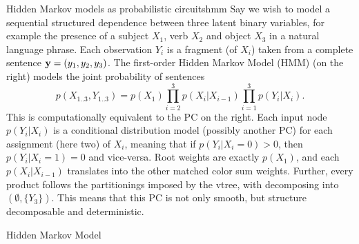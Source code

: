 \begin{example}[sidebyside,lefthand width=0.55\textwidth]{Hidden Markov models as probabilistic circuits}{hmm}
  Say we wish to model a sequential structured dependence between three latent binary variables, for
  example the presence of a subject $X_1$, verb $X_2$ and object $X_3$ in a natural language
  phrase. Each observation $Y_i$ is a fragment (of $X_i$) taken from a complete sentence
  $\mathbf{y}=(y_1,y_2,y_3)$. The first-order Hidden Markov Model (HMM) (on the right) models the
  joint probability of sentences
  \begin{equation*}
    p(X_{1..3},Y_{1..3})=p(X_1)\prod_{i=2}^3 p(X_i|X_{i-1})\prod_{i=1}^3 p(Y_i|X_i).
  \end{equation*}
  This is computationally equivalent to the PC on the right. Each input node $p(Y_i|X_i)$ is a
  conditional distribution model (possibly another PC) for each assignment (here two) of $X_i$,
  meaning that if $p(Y_i|X_i=0)>0$, then $p(Y_i|X_i=1)=0$ and vice-versa. Root weights are exactly
  $p(X_1)$, and each $p(X_i|X_{i-1})$ translates into the other matched color sum weights. Further,
  every product follows the partitionings imposed by the vtree, with
  \inode[fill=boxgray!80]{\newProdNode} decomposing into $(\emptyset,\{Y_3\})$. This means that
  this PC is not only smooth, but structure decomposable and deterministic.
  \tcblower
  \begin{center}

    \vskip -0.25cm
    \small%
    Hidden Markov Model


\end{center}
\end{example}
